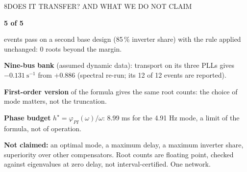 \begin{minipage}[t][\PosterLowerRowHeight][t]{\PosterHalfWidth}\vspace{0pt}
  \begin{PosterPanel}{\PosterLowerRowHeight}{8}{DOES IT TRANSFER? AND WHAT WE DO NOT CLAIM}

    \noindent\begin{minipage}[t]{150mm}\vspace{0pt}
      {\PosterCondensed\bfseries\fontsize{74pt}{78pt}\selectfont\color{IASDarkGreen}5 of 5\par}
      {\FigureSize events pass on a second base design (85\,\% inverter share) with the rule applied unchanged: 0 roots beyond the margin.\par}
    \end{minipage}\hfill%
    \begin{minipage}[t]{262mm}\vspace{0pt}
      {\FigureSize \textbf{Nine-bus bank} (assumed dynamic data): transport on its three PLLs gives $-0.131\ \mathrm{s^{-1}}$ from $+0.886$ (spectral re-run; its 12 of 12 events are reported).\par}\vspace{2mm}
      {\FigureSize \textbf{First-order version} of the formula gives the same root counts: the choice of mode matters, not the truncation.\par}\vspace{2mm}
      {\FigureSize \textbf{Phase budget} $h^{\star}=\varphi_{PI}(\omega)/\omega$: 8.99 ms for the 4.91 Hz mode, a limit of the formula, not of operation.\par}
    \end{minipage}\par
    \vspace{4mm}
    \begin{InWords}\InWordsLabel \textbf{Not claimed:} an optimal mode, a maximum delay, a maximum inverter share, superiority over other compensators. Root counts are floating point, checked against eigenvalues at zero delay, not interval-certified. One network.\end{InWords}

  \end{PosterPanel}
\end{minipage}%

